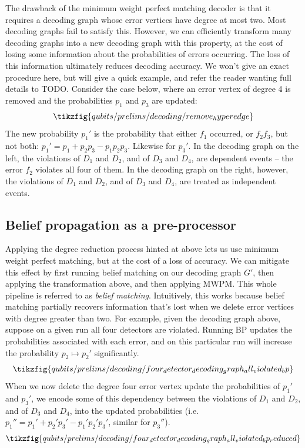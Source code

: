 The drawback of the minimum weight perfect matching decoder is that it requires a decoding graph whose error vertices have degree at most two.
Most decoding graphs fail to satisfy this.
However, we can efficiently transform many decoding graphs into a new decoding graph with this property, at the cost of losing some information about the probabilities of errors occurring.
The loss of this information ultimately reduces decoding accuracy.
We won't give an exact procedure here, but will give a quick example, and refer the reader wanting full details to TODO.
Consider the case below, where an error vertex of degree 4 is removed and the probabilities $p_1$ and $p_3$ are updated:
\begin{equation}
     \tikzfig{qubits/prelims/decoding/remove_hyperedge}
\end{equation}
The new probability $p_1'$ is the probability that either $f_1$ occurred, or $f_2 f_3$, but not both: $p_1' = p_1 + p_2 p_3 - p_1 p_2 p_3$.
Likewise for $p_3'$.
In the decoding graph on the left, the violations of $D_1$ and $D_2$, and of $D_3$ and $D_4$, are dependent events -- the error $f_2$ violates all four of them.
In the decoding graph on the right, however, the violations of $D_1$ and $D_2$, and of $D_3$ and $D_4$, are treated as independent events.

\subsection{Belief propagation as a pre-processor}

Applying the degree reduction process hinted at above lets us use minimum weight perfect matching, but at the cost of a loss of accuracy.
We can mitigate this effect by first running belief matching on our decoding graph $G'$, then applying the transformation above, and then applying MWPM.
This whole pipeline is referred to as \textit{belief matching}.
Intuitively, this works because belief matching partially recovers information that's lost when we delete error vertices with degree greater than two.
For example, given the decoding graph above, suppose on a given run all four detectors are violated.
Running BP updates the probabilities associated with each error, and on this particular run will increase the probability $p_2 \mapsto p_2'$ significantly.
\begin{equation}
    \tikzfig{qubits/prelims/decoding/four_detector_decoding_graph_all_violated_bp}
\end{equation}
When we now delete the degree four error vertex update the probabilities of $p_1'$ and $p_3'$, we encode some of this dependency between the violations of $D_1$ and $D_2$, and of $D_3$ and $D_{4}$, into the updated probabilities (i.e.\ $p_1'' = p_1' + p_2' p_3' - p_1' p_2' p_3'$, similar for $p_3''$).
\begin{equation}
    \tikzfig{qubits/prelims/decoding/four_detector_decoding_graph_all_violated_bp_reduced}
\end{equation}
